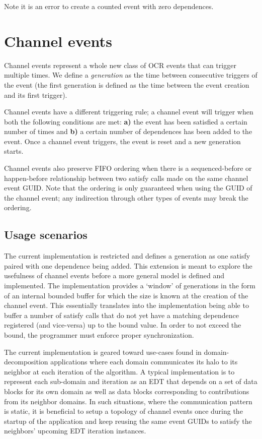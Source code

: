Note it is an error to create a counted event with zero dependences.

\section{Channel events}
Channel events represent a whole new class of OCR events that can
trigger multiple times. We define a \emph{generation} as the time
between consecutive triggers of the event (the first generation is
defined as the time between the event creation and its first trigger).

Channel events have a different triggering rule; a channel event will
trigger when both the following conditions are met: {\bf a)} the event
has been satisfied a certain number of times and {\bf b)} a certain
number of dependences has been added to the event. Once a channel
event triggers, the event is reset and a new generation starts.

Channel events also preserve FIFO ordering when
there is a sequenced-before or happen-before relationship between two
satisfy calls made on the same channel event GUID. Note that the ordering
is only guaranteed when using the GUID of the channel event; any
indirection through other types of events may break the ordering.

\subsection{Usage scenarios}
The current implementation is restricted and defines a generation as
one satisfy paired with one dependence being added. This extension
is meant to explore the usefulness of channel events before a more
general model is defined and implemented. The
implementation provides a `window' of generations in the form of an
internal bounded buffer for which the size is known at the creation of
the channel event. This essentially translates into the implementation
being able to buffer a number of satisfy calls that do not yet have a
matching dependence registered (and vice-versa) up to the bound
value. In order to not exceed the bound, the programmer must enforce
proper synchronization.

The current implementation is geared toward use-cases found in
domain-decomposition applications where each domain communicates its
halo to its neighbor at each iteration of the algorithm. A typical
implementation is to represent each sub-domain and iteration as an EDT
that depends on a set of data blocks for its own domain as well as
data blocks corresponding to
contributions from its neighbor domains. In such situations, where the
communication pattern is static, it
is beneficial to setup a topology of channel events once during the
startup of the application and keep reusing the same event GUIDs to
satisfy the neighbors' upcoming EDT iteration instances.

